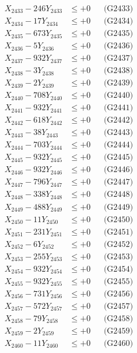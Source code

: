 \documentclass[a4paper,10pt]{article}
\begin{document}
{\begin{align}
X_{2433} - 246Y_{2433} &\leq +0 && \text{(G2433)} \\
X_{2434} - 17Y_{2434} &\leq +0 && \text{(G2434)} \\
X_{2435} - 673Y_{2435} &\leq +0 && \text{(G2435)} \\
X_{2436} - 5Y_{2436} &\leq +0 && \text{(G2436)} \\
X_{2437} - 932Y_{2437} &\leq +0 && \text{(G2437)} \\
X_{2438} - 3Y_{2438} &\leq +0 && \text{(G2438)} \\
X_{2439} - 2Y_{2439} &\leq +0 && \text{(G2439)} \\
X_{2440} - 708Y_{2440} &\leq +0 && \text{(G2440)} \\
\allowbreak
X_{2441} - 932Y_{2441} &\leq +0 && \text{(G2441)} \\
X_{2442} - 618Y_{2442} &\leq +0 && \text{(G2442)} \\
X_{2443} - 38Y_{2443} &\leq +0 && \text{(G2443)} \\
X_{2444} - 703Y_{2444} &\leq +0 && \text{(G2444)} \\
X_{2445} - 932Y_{2445} &\leq +0 && \text{(G2445)} \\
X_{2446} - 932Y_{2446} &\leq +0 && \text{(G2446)} \\
X_{2447} - 796Y_{2447} &\leq +0 && \text{(G2447)} \\
X_{2448} - 338Y_{2448} &\leq +0 && \text{(G2448)} \\
X_{2449} - 488Y_{2449} &\leq +0 && \text{(G2449)} \\
X_{2450} - 11Y_{2450} &\leq +0 && \text{(G2450)} \\
\allowbreak
X_{2451} - 231Y_{2451} &\leq +0 && \text{(G2451)} \\
X_{2452} - 6Y_{2452} &\leq +0 && \text{(G2452)} \\
X_{2453} - 255Y_{2453} &\leq +0 && \text{(G2453)} \\
X_{2454} - 932Y_{2454} &\leq +0 && \text{(G2454)} \\
X_{2455} - 932Y_{2455} &\leq +0 && \text{(G2455)} \\
X_{2456} - 731Y_{2456} &\leq +0 && \text{(G2456)} \\
X_{2457} - 572Y_{2457} &\leq +0 && \text{(G2457)} \\
X_{2458} - 79Y_{2458} &\leq +0 && \text{(G2458)} \\
X_{2459} - 2Y_{2459} &\leq +0 && \text{(G2459)} \\
X_{2460} - 11Y_{2460} &\leq +0 && \text{(G2460)} \\

\end{align}}
\end{document}
